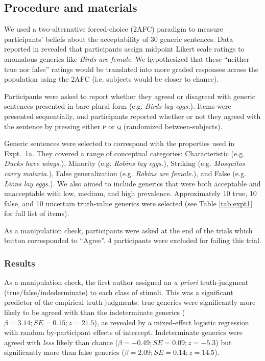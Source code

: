 \documentclass[10pt,letterpaper]{article}
\begin{document}
\subsection{Procedure and materials}
\label{sec:prior2materials}

We used a two-alternative forced-choice (2AFC) paradigm to measure participants' beliefs about the acceptability of 30 generic sentences. 
Data reported in  revealed that participants assign midpoint Likert scale ratings to anomalous generics like \emph{Birds are female}. 
We hypothesized that these ``neither true nor false'' ratings would be translated into more graded responses across the population using the 2AFC (i.e. subjects would be closer to chance).

Participants were asked to report whether they agreed or disagreed with generic sentences presented in bare plural form (e.g. \emph{Birds lay eggs.}). 
Items were presented sequentially, and participants reported whether or not they agreed with the sentence by pressing either \textsc{p} or \textsc{q} (randomized between-subjects). 

Generic sentences were selected to correspond with the properties used in Expt.~1a. 
They covered a range of conceptual categories: Characteristic (e.g. \emph{Ducks have wings.}), Minority (e.g. \emph{Robins lay eggs.}), Striking (e.g. \emph{Mosquitos carry malaria.}), False generalization (e.g. \emph{Robins are female.}), and False (e.g. \emph{Lions lay eggs.}).
We also aimed to include generics that were both acceptable and unacceptable with low, medium, and high prevalence.
Approximately 10 true, 10 false, and 10 uncertain truth-value generics were selected (see Table \ref{tab:expt1} for full list of items).

As a manipulation check, participants were asked at the end of the trials which button corresponded to ``Agree''. 4 participants were excluded for failing this trial.

\subsubsection{Results}

As a manipulation check, the first author assigned an \emph{a priori} truth-judgment (true/false/indederminate) to each class of stimuli. This was a significant predictor of the empirical truth judgments: true generics were significantly more likely to be agreed with than the indeterminate generics ($\beta = 3.14; SE = 0.15; z = 21.5$), as revealed by a mixed-effect logistic regression with random by-participant effects of intercept.
Indeterminate generics were agreed with \emph{less} likely than chance ($\beta = -0.49; SE = 0.09; z = -5.3$) but significantly more than false generics ($\beta = 2.09; SE = 0.14; z = 14.5$).
\end{document}
